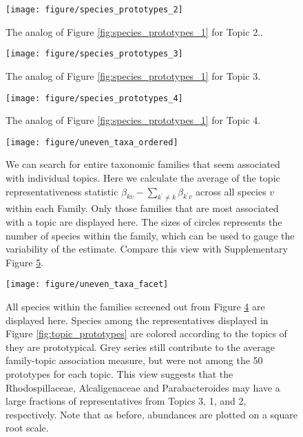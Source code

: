 \documentclass[oupdraft]{bio}
\begin{document}
\begin{figure}[!p]
  \centering
  \texttt{[image: figure/species\_prototypes\_2]}
  \caption{The analog of Figure \ref{fig:species_prototypes_1} for Topic
    2.\label{fig:species_prototypes_2}. }
\end{figure}

\begin{figure}[!p]
  \centering
  \texttt{[image: figure/species\_prototypes\_3]}
  \caption{The analog of Figure \ref{fig:species_prototypes_1} for Topic
    3. \label{fig:species_prototypes_3} }
\end{figure}

\begin{figure}[!p]
  \centering
  \texttt{[image: figure/species\_prototypes\_4]}
  \caption{The analog of Figure \ref{fig:species_prototypes_1} for Topic
    4. \label{fig:species_prototypes_4} }
\end{figure}


\begin{figure}[!p]
  \centering
  \texttt{[image: figure/uneven\_taxa\_ordered]}
  \caption{We can search for entire taxonomic families that seem associated with
    individual topics. Here we calculate the average of the topic
    representativeness statistic $\beta_{kv} - \sum_{k^{\prime} \neq k}
    \beta_{k^{\prime} v}$ across all species $v$ within each
    Family. Only those families that are most associated with a topic are
    displayed here. The sizes of circles represents the number of species within
    the family, which can be used to gauge the variability of the
    estimate. Compare this view with Supplementary Figure
    \ref{fig:uneven_taxa_facet}. \label{fig:uneven_taxa_ordered} }
\end{figure}

\begin{figure}[!p]
  \centering
  \texttt{[image: figure/uneven\_taxa\_facet]}
  \caption{All species within the families screened out from Figure
    \ref{fig:uneven_taxa_ordered} are displayed here. Species among the
    representatives displayed in Figure \ref{fig:topic_prototypes} are colored
    according to the topics of they are prototypical. Grey series still
    contribute to the average family-topic association measure, but were not
    among the 50 prototypes for each topic. This view suggests that the
    Rhodospillaceae, Alcaligenaceae and Parabacteroides may have a large
    fractions of representatives from Topics 3, 1, and 2, respectively. Note
    that as before, abundances are plotted on a square root
    scale. \label{fig:uneven_taxa_facet} }
\end{figure}
\end{document}
